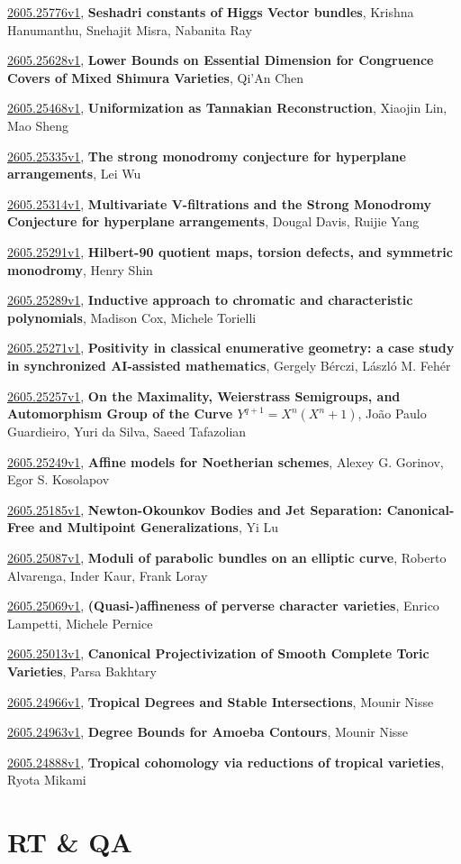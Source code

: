 \documentclass[9pt, a4paper]{article}
\theoremstyle{plain}
\theoremstyle{definition}
\theoremstyle{remark}
\newcommand{\arxiv}[3]{\href{https://arxiv.org/abs/#1}{#1}, \textbf{\textcolor{arxivblue}{#2}}, #3}
\begin{document}
\arxiv{2605.25776v1}{Seshadri constants of Higgs Vector bundles}{Krishna Hanumanthu, Snehajit Misra, Nabanita Ray}

\arxiv{2605.25628v1}{Lower Bounds on Essential Dimension for Congruence Covers of Mixed Shimura Varieties}{Qi'An Chen}

\arxiv{2605.25468v1}{Uniformization as Tannakian Reconstruction}{Xiaojin Lin, Mao Sheng}

\arxiv{2605.25335v1}{The strong monodromy conjecture for hyperplane arrangements}{Lei Wu}

\arxiv{2605.25314v1}{Multivariate V-filtrations and the Strong Monodromy Conjecture for hyperplane arrangements}{Dougal Davis, Ruijie Yang}

\arxiv{2605.25291v1}{Hilbert-90 quotient maps, torsion defects, and symmetric monodromy}{Henry Shin}

\arxiv{2605.25289v1}{Inductive approach to chromatic and characteristic polynomials}{Madison Cox, Michele Torielli}

\arxiv{2605.25271v1}{Positivity in classical enumerative geometry: a case study in synchronized AI-assisted mathematics}{Gergely Bérczi, László M. Fehér}

\arxiv{2605.25257v1}{On the Maximality, Weierstrass Semigroups, and Automorphism Group of the Curve $Y^{q+1} = X^n(X^n + 1)$}{João Paulo Guardieiro, Yuri da Silva, Saeed Tafazolian}

\arxiv{2605.25249v1}{Affine models for Noetherian schemes}{Alexey G. Gorinov, Egor S. Kosolapov}

\arxiv{2605.25185v1}{Newton-Okounkov Bodies and Jet Separation: Canonical-Free and Multipoint Generalizations}{Yi Lu}

\arxiv{2605.25087v1}{Moduli of parabolic bundles on an elliptic curve}{Roberto Alvarenga, Inder Kaur, Frank Loray}

\arxiv{2605.25069v1}{(Quasi-)affineness of perverse character varieties}{Enrico Lampetti, Michele Pernice}

\arxiv{2605.25013v1}{Canonical Projectivization of Smooth Complete Toric Varieties}{Parsa Bakhtary}

\arxiv{2605.24966v1}{Tropical Degrees and Stable Intersections}{Mounir Nisse}

\arxiv{2605.24963v1}{Degree Bounds for Amoeba Contours}{Mounir Nisse}

\arxiv{2605.24888v1}{Tropical cohomology via reductions of tropical varieties}{Ryota Mikami}


\section{RT \& QA}
\end{document}
